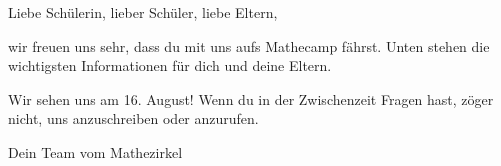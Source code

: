 \documentclass[12pt]{zettel}
\begin{document}
\renewcommand{\betreff}{Mathecamp des Matheschülerzirkels Augsburg}

\makeletterhead{}
\vspace{-2em}

Liebe Schülerin, lieber Schüler, liebe Eltern,

wir freuen uns sehr, dass du mit uns aufs Mathecamp
fährst. Unten stehen die wichtigsten Informationen für dich und deine Eltern.




Wir sehen uns am 16. August! Wenn du in der Zwischenzeit Fragen hast, zöger
nicht, uns anzuschreiben oder anzurufen.

\vspace{1em}

Dein Team vom Mathezirkel


\end{document}
